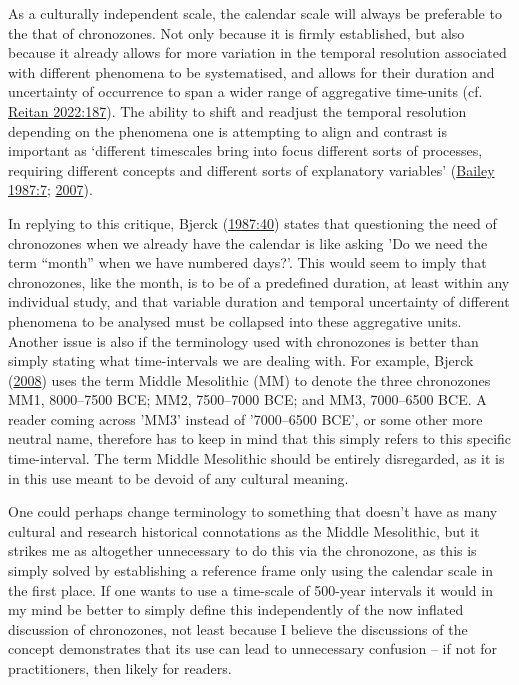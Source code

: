 \documentclass[
  12pt,
  a4paper,
  oneside]{book}
\begin{document}
As a culturally independent scale, the calendar scale will always be preferable to the that of chronozones. Not only because it is firmly established, but also because it already allows for more variation in the temporal resolution associated with different phenomena to be systematised, and allows for their duration and uncertainty of occurrence to span a wider range of aggregative time-units (cf. \protect\hyperlink{ref-reitan2022}{Reitan 2022:187}). The ability to shift and readjust the temporal resolution depending on the phenomena one is attempting to align and contrast is important as `different timescales bring into focus different sorts of processes, requiring different concepts and different sorts of explanatory variables' (\protect\hyperlink{ref-bailey1987}{Bailey 1987:7}; \protect\hyperlink{ref-bailey2007}{2007}).

In replying to this critique, Bjerck (\protect\hyperlink{ref-bjerck1987}{1987:40}) states that questioning the need of chronozones when we already have the calendar is like asking 'Do we need the term ``month'' when we have numbered days?'. This would seem to imply that chronozones, like the month, is to be of a predefined duration, at least within any individual study, and that variable duration and temporal uncertainty of different phenomena to be analysed must be collapsed into these aggregative units. Another issue is also if the terminology used with chronozones is better than simply stating what time-intervals we are dealing with. For example, Bjerck (\protect\hyperlink{ref-bjerck2008}{2008}) uses the term Middle Mesolithic (MM) to denote the three chronozones MM1, 8000--7500 BCE; MM2, 7500--7000 BCE; and MM3, 7000--6500 BCE. A reader coming across 'MM3' instead of '7000--6500 BCE', or some other more neutral name, therefore has to keep in mind that this simply refers to this specific time-interval. The term Middle Mesolithic should be entirely disregarded, as it is in this use meant to be devoid of any cultural meaning.

One could perhaps change terminology to something that doesn't have as many cultural and research historical connotations as the Middle Mesolithic, but it strikes me as altogether unnecessary to do this via the chronozone, as this is simply solved by establishing a reference frame only using the calendar scale in the first place. If one wants to use a time-scale of 500-year intervals it would in my mind be better to simply define this independently of the now inflated discussion of chronozones, not least because I believe the discussions of the concept demonstrates that its use can lead to unnecessary confusion -- if not for practitioners, then likely for readers.
\end{document}

